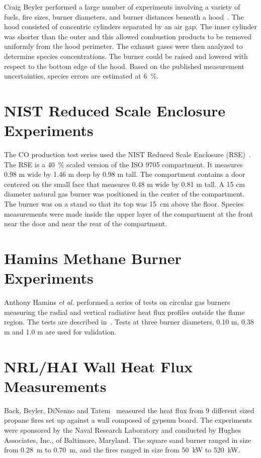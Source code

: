 Craig Beyler performed a large number of experiments involving a variety of fuels, fire sizes, burner diameters, and
burner distances beneath a hood~\cite{Beyler:Hood}.  The hood consisted of concentric cylinders separated
by an air gap.  The inner cylinder was shorter than the outer and this allowed combustion products to be removed
uniformly from the hood perimeter.  The exhaust gases were then analyzed to determine species concentrations.
The burner could be raised and lowered with respect to the bottom edge of the hood.  Based on the published
measurement uncertainties, species errors are estimated at 6~\%.


\section{NIST Reduced Scale Enclosure Experiments}

The CO production test series used the NIST Reduced Scale Enclosure (RSE)~\cite{Bryner:1}.  The RSE is a
40~\% scaled version of the ISO 9705 compartment.
It measures 0.98 m wide by 1.46 m deep by 0.98 m tall.  The compartment contains a door centered on the small
face that measures 0.48 m wide by 0.81 m tall.  A 15 cm diameter natural gas burner was positioned in the
center of the compartment.  The burner was on a stand so that its top was 15~cm above the floor.
Species measurements were made inside the upper layer of the compartment at the front near the door
and near the rear of the compartment.


\section{Hamins Methane Burner Experiments}

Anthony Hamins {\em et al.} performed a series of tests on circular gas
burners measuring the radial and vertical radiative heat flux profiles
outside the flame region. The tests are described
in~\cite{Hostikka:3}. Tests at three burner diameters, 0.10 m, 0.38 m
and 1.0 m are used for validation.


\section{NRL/HAI Wall Heat Flux Measurements}

Back, Beyler, DiNenno and Tatem~\cite{Back:IAFSS4} measured the heat flux from 9 different sized propane fires set up against a wall composed
of gypsum board. The experiments were sponsored by the Naval Research Laboratory and conducted by Hughes Associates, Inc., of Baltimore, Maryland. The
square sand burner ranged in size from 0.28~m to 0.70~m, and the fires ranged in size from 50~kW to 520~kW.

